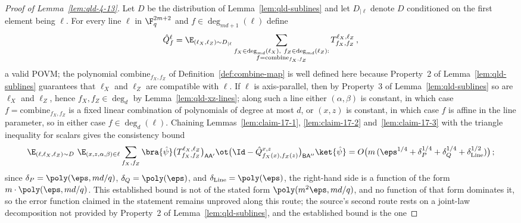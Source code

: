 \begin{proof}[Proof of Lemma~\ref{lem:qld-4-13}]
	Let $D$ be the distribution of Lemma~\ref{lem:qld-sublines} and let
	$D_{|\ell}$ denote $D$ conditioned on the first element being $\ell$.
	For every line $\ell$ in $\F_q^{2m+2}$ and $f \in \deg_{md+1}(\ell)$
	define
	\[
		\hat{Q}^{\ell}_{f}
		= \E_{(\ell_X,\ell_Z) \sim D_{|\ell}}
		\sum_{\substack{f_X \in \deg_{md}(\ell_X),\
			f_Z \in \deg_{md}(\ell_Z):\\
			f = \mathrm{combine}_{f_X,f_Z}}}
		T^{\ell_X,\ell_Z}_{f_X,f_Z}\,,
	\]
	a valid POVM; the polynomial $\mathrm{combine}_{f_X,f_Z}$ of
	Definition~\ref{def:combine-map} is well defined here because Property~2
	of Lemma~\ref{lem:qld-sublines} guarantees that $\ell_X$ and $\ell_Z$
	are compatible with $\ell$. If $\ell$ is axis-parallel, then by
	Property~3 of Lemma~\ref{lem:qld-sublines} so are $\ell_X$ and
	$\ell_Z$, hence $f_X, f_Z \in \deg_d$ by Lemma~\ref{lem:qld-xz-lines};
	along such a line either $(\alpha,\beta)$ is constant, in which case
	$f = \mathrm{combine}_{f_X,f_Z}$ is a fixed linear combination of
	polynomials of degree at most $d$, or $(x,z)$ is constant, in which case
	$f$ is affine in the line parameter, so in either case
	$f \in \deg_d(\ell)$. Chaining Lemmas~\ref{lem:claim-17-1},
	\ref{lem:claim-17-2} and~\ref{lem:claim-17-3} with the triangle
	inequality for scalars gives the consistency bound
	\begin{equation}
		\label{eq:qld-combined-lines-consistency}
		\E_{(\ell,\ell_X,\ell_Z) \sim D}\
		\E_{(x,z,\alpha,\beta) \in \ell}
		\sum_{f_X,f_Z} \bra{\hat\psi}
		\big(T^{\ell_X,\ell_Z}_{f_X,f_Z}\big)_{\mathsf{A}\mathsf{A}'} \ot
		\big(\Id - \hat{Q}^{x,z}_{f_X(x),f_Z(z)}
		\big)_{\mathsf{B}\mathsf{A}''}
		\ket{\hat\psi}
		= O\big(m\,(\eps^{1/4} + \delta_P^{1/4} + \delta_Q^{1/4}
		+ \delta_{\mathrm{Line}}^{1/2})\big)\,;
	\end{equation}
	since
	$\delta_P = \poly(\eps, md/q)$, $\delta_Q = \poly(\eps)$, and
	$\delta_{\mathrm{Line}} = \poly(\eps)$, the right-hand side is a
	function of the form $m \cdot \poly(\eps, md/q)$. This established
	bound is not of the stated form $\poly(m^2\eps, md/q)$, and no
	function of that form dominates it, so the error function claimed in
	the statement remains unproved along this route; the source's second
	route rests on a joint-law decomposition not provided by Property~2 of
	Lemma~\ref{lem:qld-sublines}, and the established bound is the one

\end{proof}
